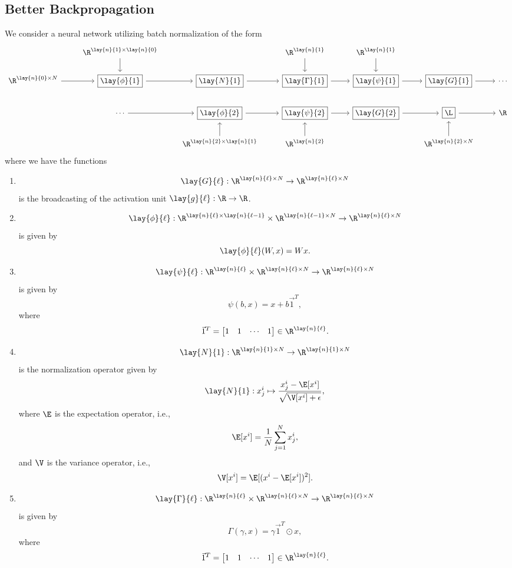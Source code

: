 




\subsection{Better Backpropagation}

We consider a neural network utilizing batch normalization of the form
{\tiny
\begin{equation*}
	\begin{tikzcd}
		{}
		&\R^{\lay{n}{1}\times\lay{n}{0}}
		\arrow[d]
		&{}
		&\R^{\lay{n}{1}}
		\arrow[d]
		&\R^{\lay{n}{1}}
		\arrow[d]
		&{}
		\\
		\R^{\lay{n}{0}\times N}
		\arrow[r]
		&\boxed{\lay{\phi}{1}}
		\arrow[r]
		&\boxed{\lay{N}{1}}
		\arrow[r]
		&\boxed{\lay{\Gamma}{1}}
		\arrow[r]
		&\boxed{\lay{\psi}{1}}
		\arrow[r]
		&\boxed{\lay{G}{1}}
		\arrow[r]
		&\cdots\\
		{}
		&\cdots
		\arrow[r]
		&\boxed{\lay{\phi}{2}}
		\arrow[r]
		&\boxed{\lay{\psi}{2}}
		\arrow[r]
		&\boxed{\lay{G}{2}}
		\arrow[r]
		&\boxed{\L}
		\arrow[r]
		&\R
		\\
		{}
		&{}
		&\R^{\lay{n}{2}\times\lay{n}{1}}
		\arrow[u]
		&\R^{\lay{n}{2}}
		\arrow[u]
		&{}
		&\R^{\lay{n}{2}\times N}
		\arrow[u]
		&{}
	\end{tikzcd}
\end{equation*}
}
where we have the functions
\begin{enumerate}
	\item $$\lay{G}{\ell}:\R^{\lay{n}{\ell}\times N}\to\R^{\lay{n}{\ell}\times N}$$
	is the broadcasting of the activation unit $\lay{g}{\ell}:\R\to\R$.
	
	\item $$\lay{\phi}{\ell}:\R^{\lay{n}{\ell}\times\lay{n}{\ell-1}}\times\R^{\lay{n}{\ell-1}\times N}\to\R^{\lay{n}{\ell}\times N}$$
	is given by
	$$\lay{\phi}{\ell}(W,x)=Wx.$$
	
	\item $$\lay{\psi}{\ell}:\R^{\lay{n}{\ell}}\times\R^{\lay{n}{\ell}\times N}\to\R^{\lay{n}{\ell}\times N}$$
	is given by
	$$\psi(b,x)=x+b\vec{1}^T,$$
	where
	$$\vec{1}^T=\begin{bmatrix}
		1&1&\cdots&1
	\end{bmatrix}\in\R^{\lay{n}{\ell}}.$$
	
	\item $$\lay{N}{1}:\R^{\lay{n}{1}\times N}\to\R^{\lay{n}{1}\times N}$$
	is the normalization operator given by
	$$\lay{N}{1}:x^i_j\mapsto \frac{x^i_j-\E[x^i]}{\sqrt{\V[x^i]+\epsilon}},$$
	where $\E$ is the expectation operator, i.e.,
	$$\E[x^i]=\frac{1}{N}\sum_{j=1}^Nx^i_j,$$
	and $\V$ is the variance operator, i.e.,
	$$\V[x^i]=\E[(x^i-\E[x^i])^2].$$
	
	\item $$\lay{\Gamma}{\ell}:\R^{\lay{n}{\ell}}\times\R^{\lay{n}{\ell}\times N}\to\R^{\lay{n}{\ell}\times N}$$
	is given by
	$$\Gamma(\gamma, x)=\gamma\vec{1}^T\odot x,$$
	where
	$$\vec{1}^T=\begin{bmatrix}
		1&1&\cdots&1
	\end{bmatrix}\in\R^{\lay{n}{\ell}}.$$
\end{enumerate}

